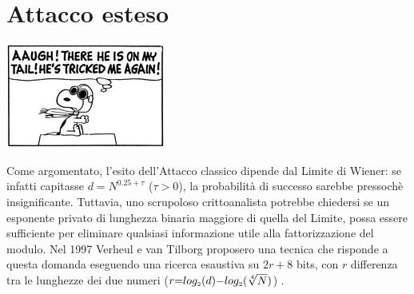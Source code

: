 \documentclass[twoside,symmetric,justified,openany,nobib]{tufte-book}
\def\P#1{_{\text{\tiny $#1$}}}
\begin{document}
\section*{\normalfont\textbf{Attacco esteso}}
\begin{marginfigure}[8pt]
  \center
  \includegraphics[width=\textwidth]{red_baron2.png}
\end{marginfigure}
Come argomentato, l'esito dell'Attacco classico dipende dal Limite di Wiener: se infatti capitasse $d{=}N^{0.25{+}\tau}$ ($\tau{>}0$), la probabilità di successo sarebbe pressochè insignificante. Tuttavia, uno scrupoloso crittoanalista potrebbe chiedersi se un esponente privato di lunghezza binaria maggiore di quella del Limite, possa essere sufficiente per eliminare qualsiasi informazione utile alla fattorizzazione del modulo.
Nel 1997 Verheul e van Tilborg proposero una tecnica che risponde a questa domanda eseguendo una ricerca esaustiva su $2r{+}8$ bits, con $r$ differenza tra le lunghezze dei due numeri ($r{=}log\P{2}(d){-}log\P{2}(\sqrt[4]{N})$) \cite{verheul}.
\end{document}
